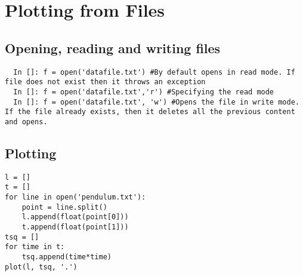 \documentclass[12pt]{article}
\begin{document}
\section{Plotting from Files}
\subsection{Opening, reading and writing files}

\begin{lstlisting}
  In []: f = open('datafile.txt') #By default opens in read mode. If file does not exist then it throws an exception
  In []: f = open('datafile.txt','r') #Specifying the read mode
  In []: f = open('datafile.txt', 'w') #Opens the file in write mode. If the file already exists, then it deletes all the previous content and opens.
\end{lstlisting}
\subsection{Plotting}
\begin{lstlisting}
l = []
t = []
for line in open('pendulum.txt'):
    point = line.split()
    l.append(float(point[0]))
    t.append(float(point[1]))
tsq = []
for time in t:
    tsq.append(time*time)
plot(l, tsq, '.')
\end{lstlisting}
\end{document}
